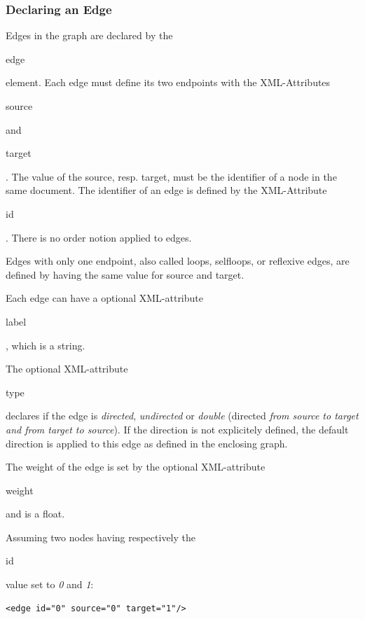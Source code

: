 \documentclass[a4paper,10pt]{article}
\begin{document}
\subsubsection{Declaring an Edge}

Edges in the graph are declared by the \begin{footnotesize}edge\end{footnotesize} element. Each edge must define its two endpoints with the XML-Attributes \begin{footnotesize}source\end{footnotesize} and \begin{footnotesize}target\end{footnotesize}. The value of the source, resp. target, must be the identifier of a node in the same document. The identifier of an edge is defined by the XML-Attribute \begin{footnotesize}id\end{footnotesize}. There is no order notion applied to edges.

Edges with only one endpoint, also called loops, selfloops, or reflexive edges, are defined by having the same value for source and target.

Each edge can have a optional XML-attribute \begin{footnotesize}label\end{footnotesize}, which is a string.

The optional XML-attribute \begin{footnotesize}type\end{footnotesize} declares if the edge is \textit{directed}, \textit{undirected} or \textit{double} (directed \textit{from source to target and from target to source}). If the direction is not explicitely defined, the default direction is applied to this edge as defined in the enclosing graph.

The weight of the edge is set by the optional XML-attribute \begin{footnotesize}weight\end{footnotesize} and is a float.

Assuming two nodes having respectively the \begin{footnotesize}id\end{footnotesize} value set to \textit{0} and \textit{1}:

\lstset{ style=gexf }
\begin{lstlisting}[caption={An edge!},label=anEdge]
<edge id="0" source="0" target="1"/>
\end{lstlisting}
\end{document}
